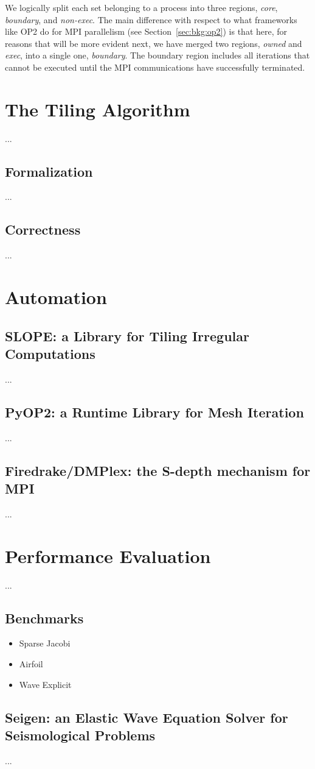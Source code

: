 We logically split each set belonging to a process into three regions, \textit{core}, \textit{boundary}, and \textit{non-exec}. The main difference with respect to what frameworks like OP2 do for MPI parallelism (see Section~\ref{sec:bkg:op2}) is that here, for reasons that will be more evident next, we have merged two regions, \textit{owned} and \textit{exec}, into a single one, \textit{boundary}. The boundary region includes all iterations that cannot be executed until the MPI communications have successfully terminated.




\section{The Tiling Algorithm}
\label{sec:tiling:algo}
...

\subsection{Formalization}
...

\subsection{Correctness}
...


\section{Automation}
\label{sec:tiling:automation}

\subsection{SLOPE: a Library for Tiling Irregular Computations}
...

\subsection{PyOP2: a Runtime Library for Mesh Iteration}
...

\subsection{Firedrake/DMPlex: the S-depth mechanism for MPI}
...


\section{Performance Evaluation}
...

\subsection{Benchmarks}
\begin{itemize}
\item Sparse Jacobi
\item Airfoil
\item Wave Explicit
\end{itemize}

\subsection{Seigen: an Elastic Wave Equation Solver for Seismological Problems}
\label{sec:tiling:seigen}
...
